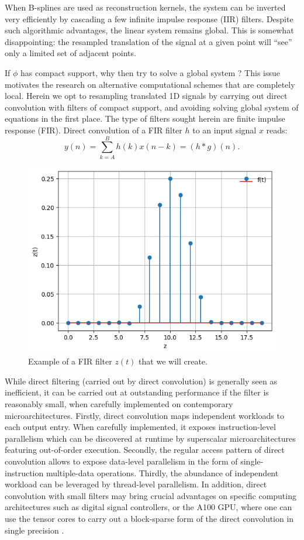 \documentclass[]{usiinfbachelorproject}
\begin{document}
	When B-splines are used as reconstruction kernels, the system can be inverted very efficiently \cite{unser1993b} by cascading a few infinite impulse response (IIR) filters.
	Despite such algorithmic advantages, the linear system remains global. This is somewhat disappointing: the resampled translation of the signal at a given point will ``see'' only a limited set of adjacent points. 
	
	If $\phi$ has compact support, why then try to solve a global system ? This issue motivates the research on alternative computational schemes that are completely local.
	Herein we opt to resampling translated 1D signals by carrying out direct convolution with filters of compact support, and avoiding solving global system of equations in the first place.     The type of filters sought herein are finite impulse response (FIR). 
	Direct convolution of a FIR filter $h$ to an input signal $x$ reads:
	\begin{equation}
		y(n) = \sum_{k=A}^{B}h(k)x(n-k)=(h*g)(n).
		\label{direct_convolution_equation}
	\end{equation}
	
	\begin{figure}
		\centering
		\includegraphics[width=0.4\columnwidth]{images/ifft_filter_m_2_25_shift.png}
		\caption{Example of a FIR filter $z(t)$ that we will create.}
		\label{fig:final_filter}
	\end{figure}
	
	While direct filtering (carried out by direct convolution) is generally seen as inefficient, it can be carried out at outstanding performance if the filter is reasonably small, when carefully implemented on contemporary microarchitectures. Firstly,
	direct convolution maps independent workloads to each output entry. When carefully implemented, it exposes instruction-level parallelism which can be discovered at runtime by superscalar microarchitectures featuring out-of-order execution. Secondly, the regular access pattern of direct convolution allows to expose data-level parallelism in the form of single-instruction multiple-data operations. Thirdly, the abundance of independent workload can be leveraged by thread-level parallelism.
	In addition, direct convolution with small filters may bring crucial advantages on specific computing architectures such as digital signal controllers, or the A100 GPU, where one can use the tensor cores to carry out a block-sparse form of the direct convolution in single precision \cite{a100whitepaper}.
	
\end{document}
